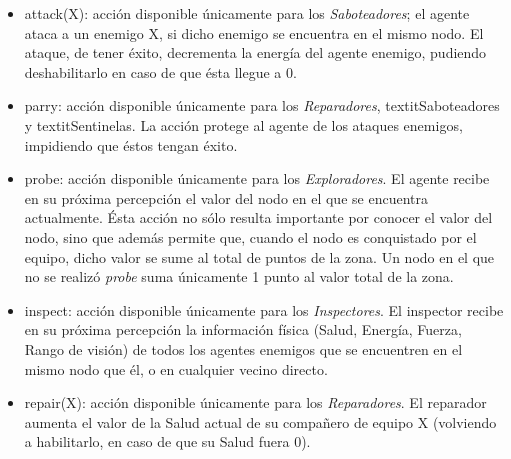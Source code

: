  \begin{itemize}
 
 \item attack(X): acción disponible únicamente para los
 \textit{Saboteadores}; el agente ataca a un enemigo X, si dicho
 enemigo se encuentra en el mismo nodo.
 El ataque, de tener éxito, decrementa la energía del agente enemigo,
 pudiendo deshabilitarlo en caso de que ésta llegue a 0.

 \item parry: acción disponible únicamente para los
 \textit{Reparadores}, textit{Saboteadores} y textit{Sentinelas}.
 La acción protege al agente de los ataques enemigos, impidiendo que
 éstos tengan éxito.
 
 \item probe: acción disponible únicamente para los 
 \textit{Exploradores}.
 El agente recibe en su próxima percepción el valor del nodo en el que
 se encuentra actualmente.
 Ésta acción no sólo resulta importante por conocer el valor del nodo,
 sino que además permite que, cuando el nodo es conquistado por el
 equipo, dicho valor se sume al total de puntos de la zona.
 Un nodo en el que no se realizó \textit{probe} suma únicamente 1 punto
 al valor total de la zona.
 
 \item inspect: acción disponible únicamente para los
 \textit{Inspectores}.
 El inspector recibe en su próxima percepción la información física
 (Salud, Energía, Fuerza, Rango de visión) de todos los agentes
 enemigos que se encuentren en el mismo nodo que él, o en cualquier
 vecino directo.
 
 \item repair(X): acción disponible únicamente para los
 \textit{Reparadores}.
 El reparador aumenta el valor de la Salud actual de su compañero de
 equipo X (volviendo a habilitarlo, en caso de que su Salud fuera 0).
 
 \end{itemize}

